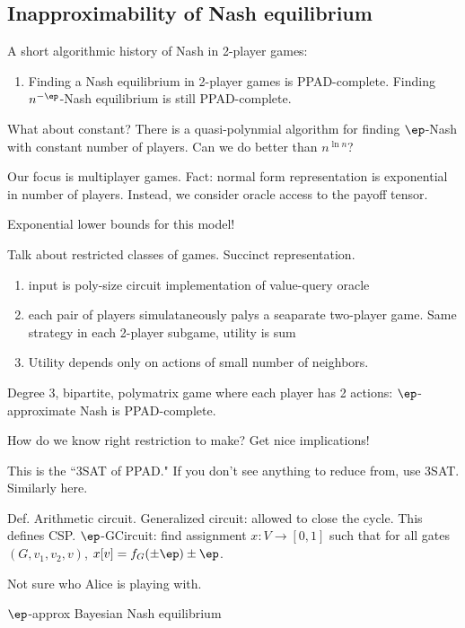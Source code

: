 \subsection{Inapproximability of Nash equilibrium}

A short algorithmic history of Nash in 2-player games: 
\begin{enumerate}
\item
Finding a Nash equilibrium in 2-player games is PPAD-complete.
Finding $n^{-\ep}$-Nash equilibrium is still PPAD-complete.
\end{enumerate}
What about constant? There is a quasi-polynmial algorithm for finding $\ep$-Nash with constant number of players. Can we do better than $n^{\ln n}$?

Our focus is multiplayer games.
Fact: normal form representation is exponential in number of players. 
Instead, we consider oracle access to the payoff tensor.

Exponential lower bounds for this model!

Talk about restricted classes of games. Succinct representation.
\begin{enumerate}
\item
input is poly-size circuit implementation of value-query oracle
\item
each pair of players simulataneously palys a seaparate two-player game. Same strategy in each 2-player subgame, utility is sum
\item
Utility depends only on actions of small number of neighbors.
\end{enumerate}
\begin{thm}
Degree 3, bipartite, polymatrix game where each player has 2 actions: $\ep$-approximate Nash is PPAD-complete.
\end{thm}

How do we know right restriction to make? Get nice implications!

This is the ``3SAT of PPAD."
If you don't see anything to reduce from, use 3SAT. Similarly here.

Def. Arithmetic circuit. Generalized circuit: allowed to close the cycle. This defines CSP. 
$\ep$-GCircuit: find assignment $x:V\to [0,1]$ such that for all gates $(G,v_1,v_2,v)$, $x[v]=f_G(\pm \ep)\pm \ep$.

Not sure who Alice is playing with. %

$\ep$-approx Bayesian Nash equilibrium


